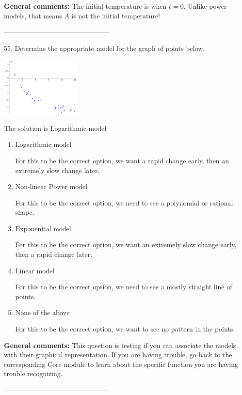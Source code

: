 \documentclass{extbook}[14pt]
\begin{document}
\textbf{General comments:} The initial temperature is when $t = 0$. Unlike power models, that means $A$ is not the initial temperature!

-----------------------------------------------

55. Determine the appropriate model for the graph of points below.
\begin{center} \includegraphics[width=0.3\textwidth]{../Figures/identifyModelGraph11C.png} \end{center} 

The solution is $ \text{Logarithmic model} $ 

\begin{enumerate}[label=\Alph*.] 
\item $ \text{Logarithmic model} $ 

 For this to be the correct option, we want a rapid change early, then an extremely slow change later. 
\item $ \text{Non-linear Power model} $ 

 For this to be the correct option, we need to see a polynomial or rational shape. 
\item $ \text{Exponential model} $ 

 For this to be the correct option, we want an extremely slow change early, then a rapid change later. 
\item $ \text{Linear model} $ 

 For this to be the correct option, we need to see a mostly straight line of points. 
\item $ \text{None of the above} $ 

 For this to be the correct option, we want to see no pattern in the points. 
\end{enumerate} 
 
\textbf{General comments:} This question is testing if you can associate the models with their graphical representation. If you are having trouble, go back to the corresponding Core module to learn about the specific function you are having trouble recognizing.

-----------------------------------------------
\end{document}
